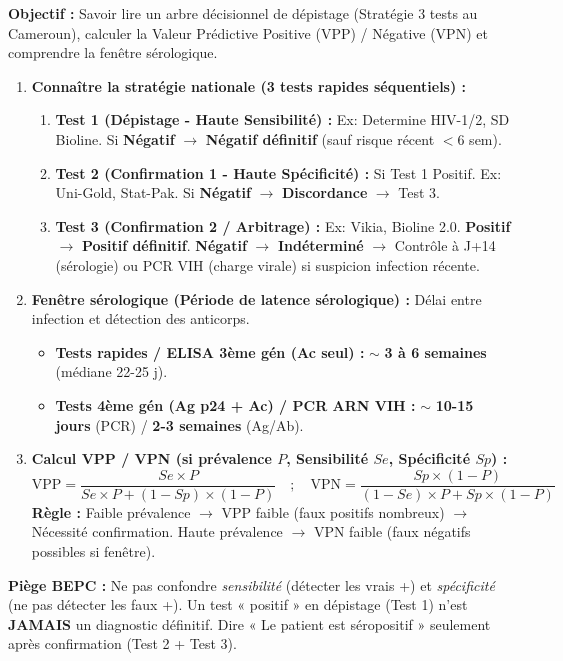 \documentclass[11pt]{article}
\begin{document}
\begin{methode}
\textbf{Objectif :} Savoir lire un arbre décisionnel de dépistage (Stratégie 3 tests au Cameroun), calculer la Valeur Prédictive Positive (VPP) / Négative (VPN) et comprendre la fenêtre sérologique.
\begin{enumerate}
    \item \textbf{Connaître la stratégie nationale (3 tests rapides séquentiels) :}
    \begin{enumerate}
        \item \textbf{Test 1 (Dépistage - Haute Sensibilité) :} Ex: Determine HIV-1/2, SD Bioline. Si \textbf{Négatif} $\rightarrow$ \textbf{Négatif définitif} (sauf risque récent $< 6$ sem).
        \item \textbf{Test 2 (Confirmation 1 - Haute Spécificité) :} Si Test 1 Positif. Ex: Uni-Gold, Stat-Pak. Si \textbf{Négatif} $\rightarrow$ \textbf{Discordance} $\rightarrow$ Test 3.
        \item \textbf{Test 3 (Confirmation 2 / Arbitrage) :} Ex: Vikia, Bioline 2.0. \textbf{Positif} $\rightarrow$ \textbf{Positif définitif}. \textbf{Négatif} $\rightarrow$ \textbf{Indéterminé} $\rightarrow$ Contrôle à J+14 (sérologie) ou PCR VIH (charge virale) si suspicion infection récente.
    \end{enumerate}
    \item \textbf{Fenêtre sérologique (Période de latence sérologique) :} Délai entre infection et détection des anticorps.
    \begin{itemize}
        \item \textbf{Tests rapides / ELISA 3ème gén (Ac seul) :} $\sim$ \textbf{3 à 6 semaines} (médiane 22-25 j).
        \item \textbf{Tests 4ème gén (Ag p24 + Ac) / PCR ARN VIH :} $\sim$ \textbf{10-15 jours} (PCR) / \textbf{2-3 semaines} (Ag/Ab).
    \end{itemize}
    \item \textbf{Calcul VPP / VPN (si prévalence $P$, Sensibilité $Se$, Spécificité $Sp$) :}
    \[
    \text{VPP} = \frac{Se \times P}{Se \times P + (1-Sp) \times (1-P)} \quad ; \quad \text{VPN} = \frac{Sp \times (1-P)}{(1-Se) \times P + Sp \times (1-P)}
    \]
    \textbf{Règle :} Faible prévalence $\rightarrow$ VPP faible (faux positifs nombreux) $\rightarrow$ Nécessité confirmation. Haute prévalence $\rightarrow$ VPN faible (faux négatifs possibles si fenêtre).
\end{enumerate}
\textbf{Piège BEPC :} Ne pas confondre \emph{sensibilité} (détecter les vrais +) et \emph{spécificité} (ne pas détecter les faux +). Un test « positif » en dépistage (Test 1) n'est \textbf{JAMAIS} un diagnostic définitif. Dire « Le patient est séropositif » seulement après confirmation (Test 2 + Test 3).
\end{methode}
\end{document}
